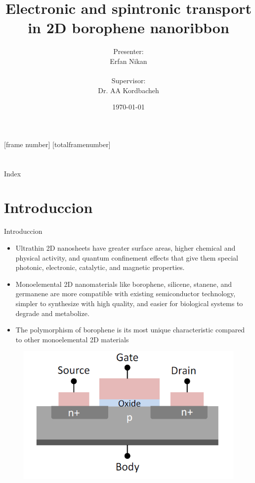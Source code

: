 \documentclass[handout,t]{beamer}
\title[Topic]{Electronic and spintronic transport in 2D borophene nanoribbon}
\author[if you want put here who aro you going to present or the name organization]
{Presenter:\\ Erfan Nikan

\\Supervisor:\\ Dr. AA Kordbacheh\\}
\date{\today}
\begin{document}
[frame number]
[totalframenumber]

\frame{\titlepage}
\section[]{}
\begin{frame}{Index}
  \tableofcontents
\end{frame}
\section{Introduccion}
\begin{frame}{Introduccion}
	\begin{itemize}
		\item Ultrathin 2D nanosheets have greater surface areas, higher chemical and physical activity, and quantum confinement effects that give them special photonic, electronic, catalytic, and magnetic properties.
		\item Monoelemental 2D nanomaterials like borophene, silicene, stanene, and germanene are more compatible with existing semiconductor technology, simpler to synthesize with high quality, and easier for biological systems to degrade and metabolize.
		\item The polymorphism of borophene is its most unique characteristic compared to other monoelemental 2D materials
	\end{itemize}
	\begin{figure}[!ht]
		\centering
		\includegraphics[width= 0.3\linewidth]{../figures/MOSFET.png}
		\label{fig:mosfet}
	\end{figure}
\end{frame}
\end{document}
